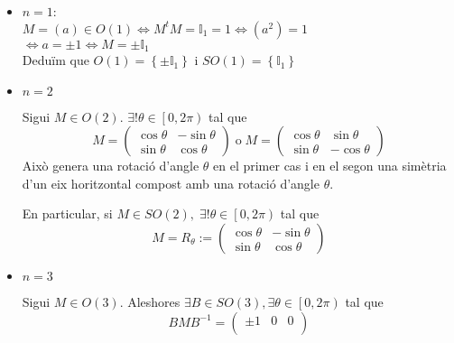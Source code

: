 \documentclass[../main.tex]{subfiles}
\begin{document}
\begin{itemize}
    \item $n = 1$:\\
    $M = (a) \in O(1) \iff M^tM = \mathbb{I}_1 = 1 \iff (a^2) = 1$\\$\iff a = \pm 1 \iff M = \pm \mathbb{I}_1$\\
    Deduïm que $O(1) = \left\{\pm \mathbb{I}_1\right\}$ i $SO(1) = \left\{\mathbb{I}_1\right\}$
    \item $n = 2$
    \begin{proposicio}
        Sigui $M \in O(2)$. $\exists! \theta \in \left[0, 2\pi\right)$ tal que\\
        \begin{displaymath}
            M = \begin{pmatrix}
                \cos{\theta} & -\sin{\theta}\\
                \sin{\theta} & \cos{\theta}
            \end{pmatrix}\;\text{o}\; M = \begin{pmatrix}
                \cos{\theta} & \sin{\theta}\\
                \sin{\theta} & -\cos{\theta}
            \end{pmatrix}
        \end{displaymath}
        Això genera una rotació d'angle $\theta$ en el primer cas i en el segon una simètria d'un
        eix horitzontal compost amb una rotació d'angle $\theta$.
    \end{proposicio}
    \begin{obs}
        En particular, si $M \in SO(2),\; \exists! \theta \in \left[0, 2\pi\right)$ tal que
        \begin{displaymath}
            M = R_\theta := \begin{pmatrix}
                \cos{\theta} & -\sin{\theta}\\
                \sin{\theta} & \cos{\theta}
            \end{pmatrix}
        \end{displaymath}
    \end{obs}
    \item $n = 3$
    \begin{proposicio}
        Sigui $M \in O(3)$. Aleshores $\exists B \in SO(3), \exists \theta \in \left[0, 2\pi\right)$
        tal que \begin{displaymath}
            BMB^{-1} = \begin{pmatrix}
                \pm 1 & 0 & 0\\

\end{pmatrix}
\end{displaymath}
\end{proposicio}
\end{itemize}
\end{document}
